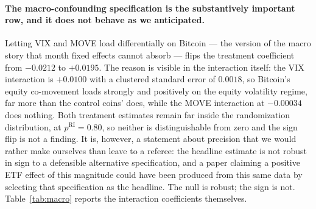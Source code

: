 \documentclass[12pt,a4paper]{article}
\begin{document}
\paragraph{The macro-confounding specification is the substantively important row, and it does not behave as we anticipated.} Letting VIX and MOVE load differentially on Bitcoin — the version of the macro story that month fixed effects cannot absorb — flips the treatment coefficient from $-0.0212$ to
$+0.0195$. The reason is visible in the interaction itself: the VIX interaction is
$+0.0100$ with a clustered standard error of $0.0018$, so Bitcoin's equity co-movement loads strongly and positively on the equity volatility regime, far more than the control coins' does, while the MOVE interaction at
$-0.00034$ does nothing. Both treatment estimates remain far inside the randomization distribution, at
$p^{\mathrm{RI}} = 0.80$, so neither is distinguishable from zero and the sign flip is not a finding. It is, however, a statement about precision that we would rather make ourselves than leave to a referee: the headline estimate is not robust in sign to a defensible alternative specification, and a paper claiming a positive ETF effect of this magnitude could have been produced from this same data by selecting that specification as the headline. The null is robust; the sign is not. Table~\ref{tab:macro} reports the interaction coefficients themselves.


\end{document}
